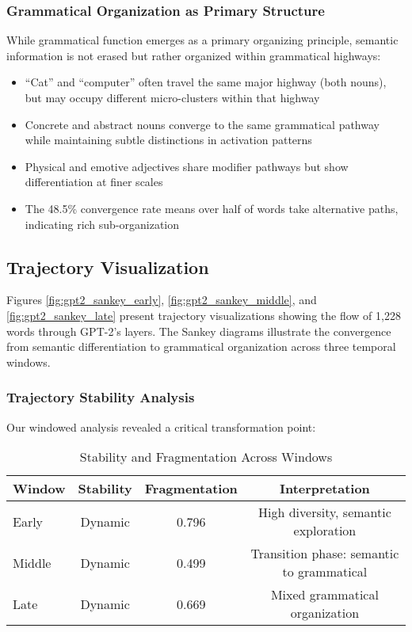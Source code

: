 \subsubsection{Grammatical Organization as Primary Structure}

While grammatical function emerges as a primary organizing principle, semantic information is not erased but rather organized within grammatical highways:
\begin{itemize}
    \item ``Cat'' and ``computer'' often travel the same major highway (both nouns), but may occupy different micro-clusters within that highway
    \item Concrete and abstract nouns converge to the same grammatical pathway while maintaining subtle distinctions in activation patterns
    \item Physical and emotive adjectives share modifier pathways but show differentiation at finer scales
    \item The 48.5\% convergence rate means over half of words take alternative paths, indicating rich sub-organization
\end{itemize}

\subsection{Trajectory Visualization}

Figures \ref{fig:gpt2_sankey_early}, \ref{fig:gpt2_sankey_middle}, and \ref{fig:gpt2_sankey_late} present trajectory visualizations showing the flow of 1,228 words through GPT-2's layers. The Sankey diagrams illustrate the convergence from semantic differentiation to grammatical organization across three temporal windows.




\subsubsection{Trajectory Stability Analysis}

Our windowed analysis revealed a critical transformation point:

\begin{table}[h!]
\centering
\caption{Stability and Fragmentation Across Windows}
\label{tab:stability_analysis}
\begin{tabular}{lccc}
\toprule
Window & Stability & Fragmentation & Interpretation \\
\midrule
Early & Dynamic & 0.796 & High diversity, semantic exploration \\
Middle & Dynamic & 0.499 & Transition phase: semantic to grammatical \\
Late & Dynamic & 0.669 & Mixed grammatical organization \\
\bottomrule
\end{tabular}
\end{table}

